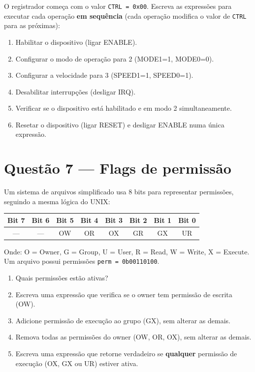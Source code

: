 \documentclass[12pt,a4paper]{article}
\begin{document}
O registrador começa com o valor \texttt{CTRL = 0x00}. Escreva as expressões para executar cada operação \textbf{em sequência} (cada operação modifica o valor de \texttt{CTRL} para as próximas):

\begin{enumerate}[label=\alph*)]
  \item Habilitar o dispositivo (ligar ENABLE).
  \item Configurar o modo de operação para 2 (MODE1=1, MODE0=0).
  \item Configurar a velocidade para 3 (SPEED1=1, SPEED0=1).
  \item Desabilitar interrupções (desligar IRQ).
  \item Verificar se o dispositivo está habilitado e em modo 2 simultaneamente.
  \item Resetar o dispositivo (ligar RESET) e desligar ENABLE numa única expressão.
\end{enumerate}

\section{Questão 7 --- Flags de permissão}

Um sistema de arquivos simplificado usa 8 bits para representar permissões, seguindo a mesma lógica do UNIX:

\begin{center}
\small
\begin{tabular}{cccccccc}
\toprule
Bit 7 & Bit 6 & Bit 5 & Bit 4 & Bit 3 & Bit 2 & Bit 1 & Bit 0 \\
\midrule
--- & --- & OW & OR & OX & GR & GX & UR \\
\bottomrule
\end{tabular}
\end{center}

Onde: O = Owner, G = Group, U = User, R = Read, W = Write, X = Execute.
Um arquivo possui permissões \texttt{perm = 0b00110100}.

\begin{enumerate}[label=\alph*)]
  \item Quais permissões estão ativas?
  \item Escreva uma expressão que verifica se o owner tem permissão de escrita (OW).
  \item Adicione permissão de execução ao grupo (GX), sem alterar as demais.
  \item Remova todas as permissões do owner (OW, OR, OX), sem alterar as demais.
  \item Escreva uma expressão que retorne verdadeiro se \textbf{qualquer} permissão de execução (OX, GX ou UR) estiver ativa.
\end{enumerate}
\end{document}
